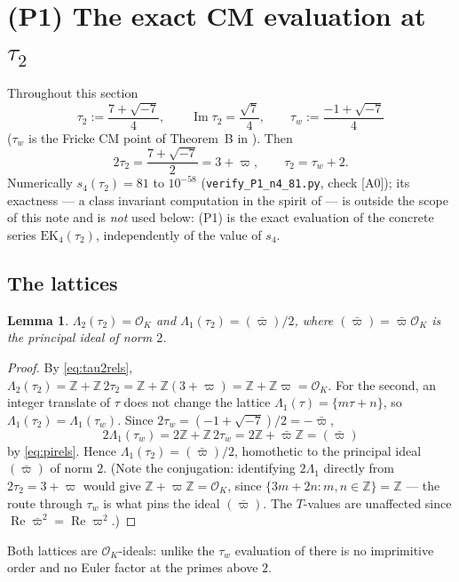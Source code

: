 \documentclass[11pt]{article}
\newtheorem{lemma}[theorem]{Lemma}
\theoremstyle{definition}
\theoremstyle{remark}
\newcommand{\Zz}{\mathbb{Z}}
\newcommand{\cL}{\Lambda}
\newcommand{\ImT}{\operatorname{Im}}
\newcommand{\ReT}{\operatorname{Re}}
\newcommand{\OO}{\mathcal{O}}
\begin{document}
\section{(P1) The exact CM evaluation at \texorpdfstring{$\tau_2$}{tau2}}\label{sec:P1}

Throughout this section
\[
  \tau_2:=\frac{7+\sqrt{-7}}4,\qquad
  \ImT\tau_2=\frac{\sqrt7}4,\qquad
  \tau_w:=\frac{-1+\sqrt{-7}}4
\]
($\tau_w$ is the Fricke CM point of Theorem~B in \cite{Zf}). Then
\begin{equation}\label{eq:tau2rels}
  2\tau_2=\frac{7+\sqrt{-7}}2=3+\varpi,\qquad \tau_2=\tau_w+2 .
\end{equation}
Numerically $s_4(\tau_2)=81$ to $10^{-58}$
(\texttt{verify\_P1\_n4\_81.py}, check [A0]); its exactness --- a class
invariant computation in the spirit of \cite[\S4.2]{Zf} --- is outside
the scope of this note and is \emph{not} used below: (P1) is the exact
evaluation of the concrete series $\mathrm{EK}_4(\tau_2)$, independently
of the value of $s_4$.

\subsection{The lattices}\label{subsec:lattices}

\begin{lemma}\label{lem:lattices4}
$\cL_2(\tau_2)=\OO_K$ and $\cL_1(\tau_2)=(\bar\varpi)/2$, where
$(\bar\varpi)=\bar\varpi\OO_K$ is the principal ideal of norm $2$.
\end{lemma}
\begin{proof}
By \eqref{eq:tau2rels},
$\cL_2(\tau_2)=\Zz+\Zz\,2\tau_2=\Zz+\Zz(3+\varpi)=\Zz+\Zz\varpi=\OO_K$.
For the second, an integer translate of $\tau$ does not change the
lattice $\cL_1(\tau)=\{m\tau+n\}$, so $\cL_1(\tau_2)=\cL_1(\tau_w)$.
Since $2\tau_w=(-1+\sqrt{-7})/2=-\bar\varpi$,
\[
  2\cL_1(\tau_w)=2\Zz+\Zz\,2\tau_w=2\Zz+\bar\varpi\Zz=(\bar\varpi)
\]
by \eqref{eq:pirels}. Hence $\cL_1(\tau_2)=(\bar\varpi)/2$, homothetic to
the principal ideal $(\bar\varpi)$ of norm $2$. (Note the conjugation:
identifying $2\cL_1$ directly from $2\tau_2=3+\varpi$ would give
$\Zz+\varpi\Zz=\OO_K$, since $\{3m+2n:m,n\in\Zz\}=\Zz$ --- the route
through $\tau_w$ is what pins the ideal $(\bar\varpi)$. The $T$-values are
unaffected since $\ReT\bar\varpi^2=\ReT\varpi^2$.)
\end{proof}

Both lattices are $\OO_K$-ideals: unlike the $\tau_w$ evaluation of
\cite[\S5]{Zf} there is no imprimitive order and no Euler factor at the
primes above $2$.
\end{document}
